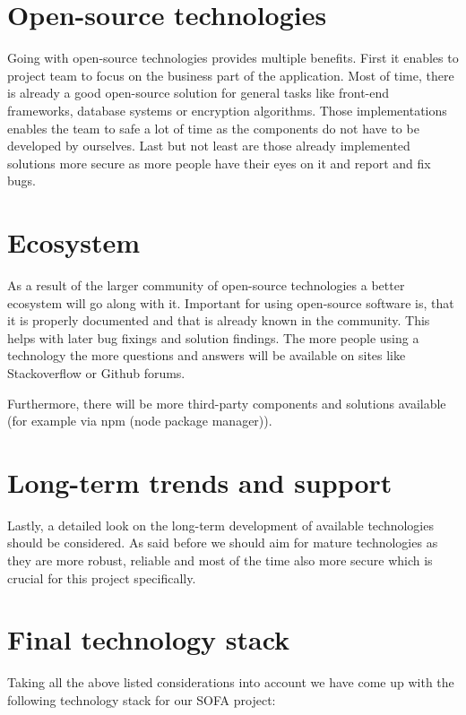 \section{Open-source technologies}

Going with open-source technologies provides multiple benefits. First it enables to project team to focus on the
business part of the application. Most of time, there is already a good open-source solution for general tasks like
front-end frameworks, database systems or encryption algorithms. Those implementations enables the team to safe a lot
of time as the components do not have to be developed by ourselves. Last but not least are those already implemented
solutions more secure as more people have their eyes on it and report and fix bugs.

\section{Ecosystem}

As a result of the larger community of open-source technologies a better ecosystem will go along with it. Important
for using open-source software is, that it is properly documented and that is already known in the community. This
helps with later bug fixings and solution findings. The more people using a technology the more questions and answers
will be available on sites like Stackoverflow or Github forums.

Furthermore, there will be more third-party components and solutions available
(for example via npm (node package manager)).

\section{Long-term trends and support}

Lastly, a detailed look on the long-term development of available technologies should be considered. As said before we
should aim for mature technologies as they are more robust, reliable and most of the time also more secure which is
crucial for this project specifically.

\section{Final technology stack}

Taking all the above listed considerations into account we have come up with the following technology stack for our
SOFA project:

